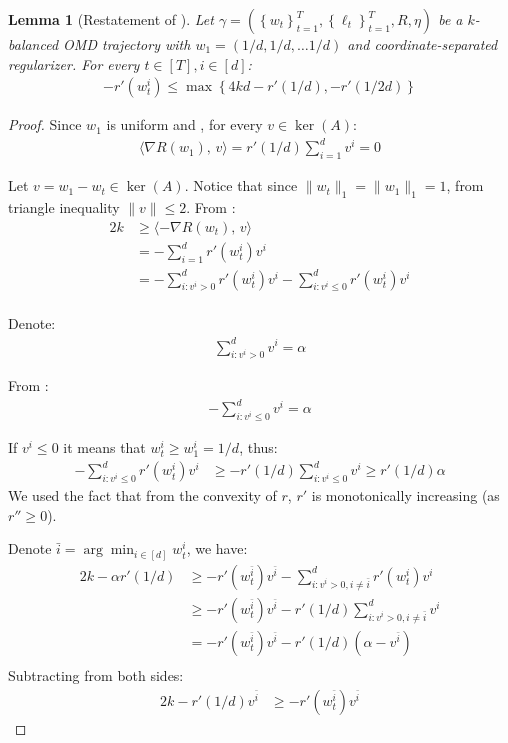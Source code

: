 \documentclass[10pt]{article}
\newtheorem*{lemma*}{Lemma}
\theoremstyle{definition}
\theoremstyle{remark}
\newcommand\inprod[2]{\langle #1,\,#2 \rangle}
\newcommand{\curly}[1]{ {\left\{ #1 \right\}}}
\begin{document}
\begin{lemma*}[Restatement of ]
Let $\gamma=(\curly{w_t}_{t=1}^T, \curly{\ell_t}_{t=1}^T, R, \eta)$ be a $k$-balanced OMD trajectory with $w_1 = (1/d,1/d,\dots 1/d)$ and coordinate-separated regularizer. For every $t\in[T],i\in[d]$:
\begin{align*}
    -r'(w_t^i) \le \max\curly{4kd - r'(1/d), -r'(1/2d)}
\end{align*}
\end{lemma*}
\begin{proof}
Since $w_1$ is uniform and , for every $v\in \ker(A)$:
\begin{align*}
    \inprod{\nabla R(w_1)}{v} = r'(1/d)\sum_{i=1}^dv^i = 0
\end{align*}

Let $v=w_1-w_t\in \ker(A)$. Notice that since $\|w_t\|_1=\|w_1\|_1=1$, from triangle inequality $\|v\|\le 2$. From :
\begin{align*}
    2k &\ge \inprod{-\nabla R(w_t)}{v}\\
    &=-\sum_{i=1}^d r'(w_t^i)v^i  \\
    &= -\sum_{i:v^i > 0}^d r'(w_t^i)v^i - \sum_{i:v^i \le 0}^d r'(w_t^i)v^i  \\
\end{align*}

Denote:
\begin{align*}
    \sum_{i:v^i > 0}^d v^i = \alpha
\end{align*}

From :
\begin{align*}
    -\sum_{i:v^i \le 0}^d v^i = \alpha
\end{align*}

If $v^i \le 0$ it means that $w_t^i \ge w_1^i = 1/d$, thus:
\begin{align*}
    -\sum_{i:v^i \le 0}^d r'(w_t^i)v^i &\ge -r'(1/d)\sum_{i:v^i \le0}^d v^i \ge r'(1/d)\alpha
\end{align*}
We used the fact that from the convexity of $r$, $r'$ is monotonically increasing (as $r''\ge 0$).

Denote $\bar{i}=\arg\min_{i\in[d]}w_t^i$, we have:
\begin{align*}
    2k - \alpha r'(1/d) &\ge -r'(w_t^{\bar{i}})v^{\bar{i}} - \sum_{i:v^i > 0,i\ne\bar{i}}^d r'(w_t^i)v^i\\
    &\ge -r'(w_t^{\bar{i}})v^{\bar{i}} - r'(1/d)\sum_{i:v^i > 0,i\ne\bar{i}}^d v^i\\
    &= -r'(w_t^{\bar{i}})v^{\bar{i}} - r'(1/d)(\alpha-v^{\bar{i}})\\
\end{align*}
Subtracting from both sides:
\begin{align*}
    2k - r'(1/d)v^{\bar{i}} &\ge -r'(w_t^{\bar{i}})v^{\bar{i}}
\end{align*}


\end{proof}
\end{document}
